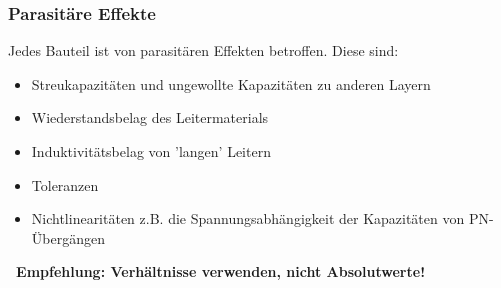 \subsubsection{Parasitäre Effekte}

Jedes Bauteil ist von parasitären Effekten betroffen. 
Diese sind:
\begin{itemize}
    \item Streukapazitäten und ungewollte Kapazitäten zu anderen Layern
    \item Wiederstandsbelag des Leitermaterials
    \item Induktivitätsbelag von 'langen' Leitern
    \item Toleranzen
    \item Nichtlinearitäten z.B. die Spannungsabhängigkeit der Kapazitäten von PN-Übergängen
\end{itemize}

\smallskip

\textbf{\rightarrow\ Empfehlung: Verhältnisse verwenden, nicht Absolutwerte!}

